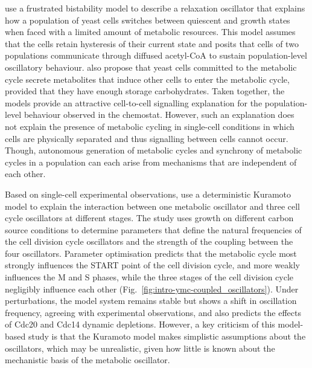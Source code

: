 \textcite{krishnaMinimalPushPull2018} use a frustrated bistability model to describe a relaxation oscillator that explains how a population of yeast cells switches between quiescent and growth states when faced with a limited amount of metabolic resources.
This model assumes that the cells retain hysteresis of their current state and posits that cells of two populations communicate through diffused acetyl-CoA to sustain population-level oscillatory behaviour.
\textcite{burnettiCellCycleStart2016} also propose that yeast cells committed to the metabolic cycle secrete metabolites that induce other cells to enter the metabolic cycle, provided that they have enough storage carbohydrates.
Taken together, the models provide an attractive cell-to-cell signalling explanation for the population-level behaviour observed in the chemostat.
However, such an explanation does not explain the presence of metabolic cycling in single-cell conditions in which cells are physically separated and thus signalling between cells cannot occur.
Though, autonomous generation of metabolic cycles and synchrony of metabolic cycles in a population can each arise from mechanisms that are independent of each other.

Based on single-cell experimental observations, \textcite{ozsezenInferenceHighLevelInteraction2019} use a deterministic Kuramoto model to explain the interaction between one metabolic oscillator and three cell cycle oscillators at different stages.
The study uses growth on different carbon source conditions to determine parameters that define the natural frequencies of the cell division cycle oscillators and the strength of the coupling between the four oscillators.
Parameter optimisation predicts that the metabolic cycle most strongly influences the START point of the cell division cycle, and more weakly influences the M and S phases, while the three stages of the cell division cycle negligibly influence each other (Fig.\ \ref{fig:intro-ymc-coupled_oscillators}).
Under perturbations, the model system remains stable but shows a shift in oscillation frequency, agreeing with experimental observations, and also predicts the effects of Cdc20 and Cdc14 dynamic depletions.
However, a key criticism of this model-based study is that the Kuramoto model makes simplistic assumptions about the oscillators, which may be unrealistic, given how little is known about the mechanistic basis of the metabolic oscillator.

